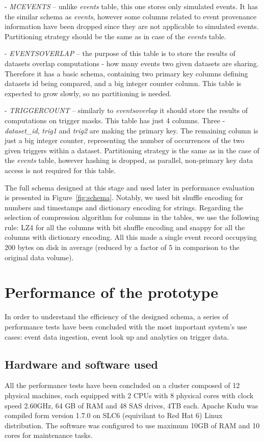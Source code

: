 \documentclass{webofc}
\begin{document}
\begin{linenumbers}
- \textit{MCEVENTS} – unlike \textit{events} table, this one stores only simulated events. It has the similar schema as \textit{events}, however some columns related to event provenance information have been dropped since they are not applicable to simulated events. Partitioning strategy should be the same as in case of the \textit{events} table.\newline

- \textit{EVENTSOVERLAP} – the purpose of this table is to store the results of datasets overlap computations - how many events two given datasets are sharing. Therefore it has a basic schema, containing two primary key columns defining datasets id being compared, and a big integer counter column. This table is expected to grow slowly, so no partitioning is needed. \newline

- \textit{TRIGGERCOUNT} – similarly to \textit{eventsoverlap} it should store the results of computations on trigger masks. This table has just 4 columns. Three - \textit{dataset\_id}, \textit{trig1} and \textit{trig2} are making the primary key. The remaining column is just a big integer counter, representing the number of occurrences of the two given triggers within a dataset. Partitioning strategy is the same as in the case of the \textit{events} table, however hashing is dropped, as parallel, non-primary key data access is not required for this table. \newline

\indent
The full schema designed at this stage and used later in performance evaluation is presented in Figure~\ref{fig:schema}.
Notably, we used bit shuffle encoding for numbers and timestamps and dictionary encoding for strings. Regarding the selection of compression algorithm for columns in the tables, we use the following rule: LZ4 for all the columns with bit shuffle encoding and snappy for all the columns with dictionary encoding. All this made a single event record occupying 200 bytes on disk in average (reduced by a factor of 5 in comparison to the original data volume).
\section{Performance of the prototype}
\label{sec-6}
In order to understand the efficiency of the designed schema, a series of performance tests have been concluded with the most important system's use cases: event data ingestion, event look up and analytics on trigger data. 
\subsection{Hardware and software used}
All the performance tests have been concluded on a cluster composed of 12 physical machines, each equipped with 2 CPUs with 8 physical cores with clock speed 2.60GHz, 64 GB of RAM and 48 SAS drives, 4TB each. Apache Kudu was compiled form version 1.7.0 on SLC6 (equivilant to Red Hat 6) Linux distribution. The software was configured to use maximum 10GB of RAM and 10 cores for maintenance tasks. 
\label{sec-6-spec}

\end{linenumbers}
\end{document}
